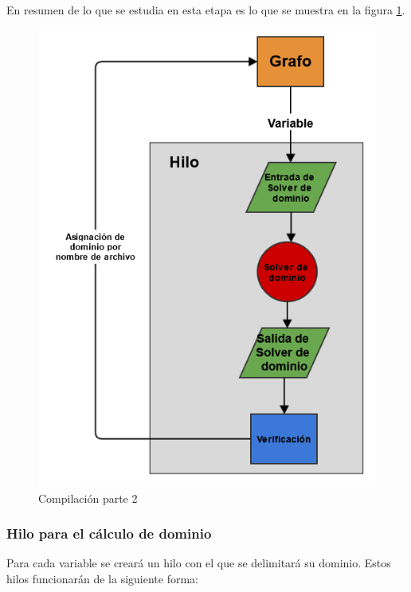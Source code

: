 En resumen de lo que se estudia en esta etapa es lo que se muestra en la figura
\ref{fig:compilacion_part_2}.

\begin{figure}[h]
	\begin{center}
		\includegraphics[scale=0.55]{imagenes/Compilacion_parte_2.png}
	\end{center}
	\caption{
		\label{fig:compilacion_part_2}
		Compilación parte 2
	}
\end{figure}

\subsubsection{Hilo para el cálculo de dominio}
Para cada variable se creará un hilo con el que se delimitará su dominio. Estos
hilos funcionarán de la siguiente forma:

